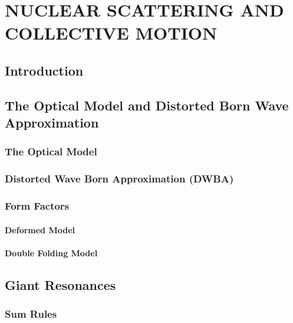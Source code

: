 %
%

\chapter{NUCLEAR SCATTERING AND COLLECTIVE MOTION}
\label{chp:nuc-scat}

\section{Introduction}
\label{sec:nuc-scat-intro}

\section{The Optical Model and Distorted Born Wave Approximation}
\label{sec:nuc-scat-om}
\subsection{The Optical Model}
\label{ssec:nuc-scat-om-om}
\subsection{Distorted Wave Born Approximation (DWBA)}
\label{ssec:nuc-scat-om-dwba}
\subsection{Form Factors}
\label{ssec:nuc-scat-om-forms}
\subsubsection{Deformed Model}
\label{sssec:nuc-scat-om-forms-def-mod}
\subsubsection{Double Folding Model}
\label{sssec:nuc-scat-om-forms-df-mod}

\section{Giant Resonances}
\label{sec:nuc-scat-gr}
\subsection{Sum Rules}
\label{ssec:nuc-scat-gr-sums}
